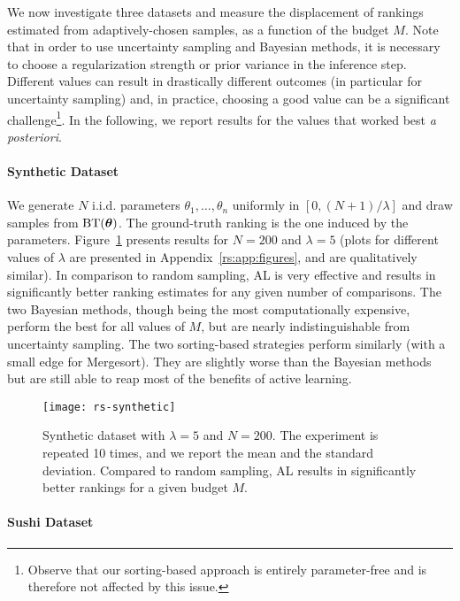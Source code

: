 We now investigate three datasets and measure the displacement of rankings estimated from adaptively-chosen samples, as a function of the budget $M$.
Note that in order to use uncertainty sampling and Bayesian methods, it is necessary to choose a regularization strength or prior variance in the inference step.
Different values can result in drastically different outcomes (in particular for uncertainty sampling) and, in practice, choosing a good value can be a significant challenge\footnote{Observe that our sorting-based approach is entirely parameter-free and is therefore not affected by this issue.}.
In the following, we report results for the values that worked best \emph{a posteriori}.


\paragraph{Synthetic Dataset}

We generate $N$ i.i.d. parameters $\theta_1, \ldots, \theta_n$ uniformly in $[0, (N\!+\!1) / \lambda]$ and draw samples from $\operatorname{BT}(\bm{\theta})$.
The ground-truth ranking is the one induced by the parameters.
Figure~\ref{rs:fig:synthetic} presents results for $N = \num{200}$ and $\lambda = \num{5}$ (plots for different values of $\lambda$ are presented in Appendix~\ref{rs:app:figures}, and are qualitatively similar).
In comparison to random sampling, AL is very effective and results in significantly better ranking estimates for any given number of comparisons.
The two Bayesian methods, though being the most computationally expensive, perform the best for all values of $M$, but are nearly indistinguishable from uncertainty sampling.
The two sorting-based strategies perform similarly (with a small edge for Mergesort).
They are slightly worse than the Bayesian methods but are still able to reap most of the benefits of active learning.

\begin{figure}[t]
\centering
\texttt{[image: rs-synthetic]}
\caption{
Synthetic dataset with $\lambda = 5$ and $N = 200$.
The experiment is repeated \num{10} times, and we report the mean and the standard deviation.
Compared to random sampling, AL results in significantly better rankings for a given budget $M$.
}
\label{rs:fig:synthetic}
\end{figure}


\paragraph{Sushi Dataset}

